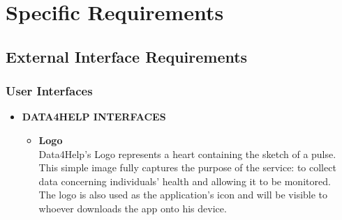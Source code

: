 \documentclass[titlepage]{article}
\begin{document}
\pagebreak	

\section{Specific Requirements}
	
	\subsection{External Interface Requirements}
		
		\subsubsection{User Interfaces}
		\begin{itemize}
			\item {\bf DATA4HELP INTERFACES} \\[1ex]
			\begin{itemize}
				\item{\bf Logo}\\
			Data4Help’s Logo represents a heart containing the sketch of a pulse. This simple image fully captures the purpose of the service: to collect data concerning individuals’ health and allowing it to be monitored. \\
The logo is also used as the application’s icon and will be visible to whoever downloads the app onto his device.


\end{itemize}
\end{itemize}
\end{document}
